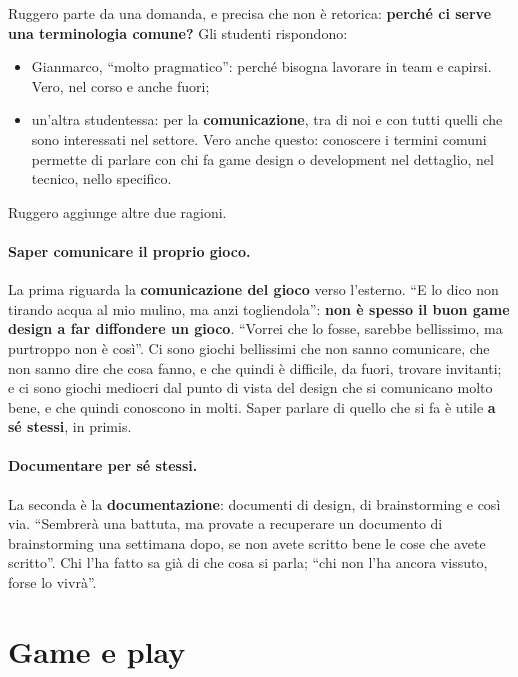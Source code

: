 Ruggero parte da una domanda, e precisa che non è retorica: \textbf{perché ci
serve una terminologia comune?} Gli studenti rispondono:
\begin{itemize}
  \item Gianmarco, ``molto pragmatico'': perché bisogna lavorare in team e
        capirsi. Vero, nel corso e anche fuori;
  \item un'altra studentessa: per la \textbf{comunicazione}, tra di noi e con
        tutti quelli che sono interessati nel settore. Vero anche questo:
        conoscere i termini comuni permette di parlare con chi fa game design o
        development nel dettaglio, nel tecnico, nello specifico.
\end{itemize}
Ruggero aggiunge altre due ragioni.

\paragraph{Saper comunicare il proprio gioco.} La prima riguarda la
\textbf{comunicazione del gioco} verso l'esterno. ``E lo dico non tirando acqua
al mio mulino, ma anzi togliendola'': \textbf{non è spesso il buon game design
a far diffondere un gioco}. ``Vorrei che lo fosse, sarebbe bellissimo, ma
purtroppo non è così''. Ci sono giochi bellissimi che non sanno comunicare, che
non sanno dire che cosa fanno, e che quindi è difficile, da fuori, trovare
invitanti; e ci sono giochi mediocri dal punto di vista del design che si
comunicano molto bene, e che quindi conoscono in molti. Saper parlare di quello
che si fa è utile \textbf{a sé stessi}, in primis.

\paragraph{Documentare per sé stessi.} La seconda è la \textbf{documentazione}:
documenti di design, di brainstorming e così via. ``Sembrerà una battuta, ma
provate a recuperare un documento di brainstorming una settimana dopo, se non
avete scritto bene le cose che avete scritto''. Chi l'ha fatto sa già di che
cosa si parla; ``chi non l'ha ancora vissuto, forse lo vivrà''.

\section{Game e play}
\label{a1:sec:game-play}



